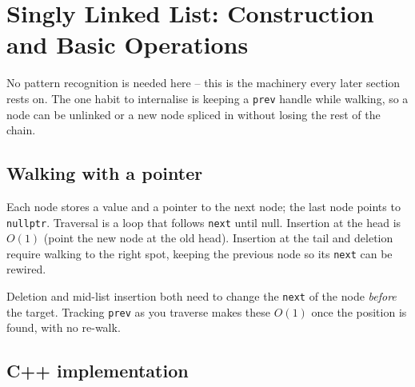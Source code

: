 \section{Singly Linked List: Construction and Basic Operations}
\label{sec:ll-singly-basics}


\begin{patternbox}
No pattern recognition is needed here -- this is the machinery every later
section rests on. The one habit to internalise is keeping a \texttt{prev}
handle while walking, so a node can be unlinked or a new node spliced in
without losing the rest of the chain.
\end{patternbox}

\subsection*{Walking with a pointer}

Each node stores a value and a pointer to the next node; the last node
points to \texttt{nullptr}. Traversal is a loop that follows \texttt{next}
until null. Insertion at the head is $O(1)$ (point the new node at the old
head). Insertion at the tail and deletion require walking to the right spot,
keeping the previous node so its \texttt{next} can be rewired.

\begin{ideabox}
Deletion and mid-list insertion both need to change the \texttt{next} of the
node \emph{before} the target. Tracking \texttt{prev} as you traverse makes
these $O(1)$ once the position is found, with no re-walk.
\end{ideabox}

\subsection*{C++ implementation}

